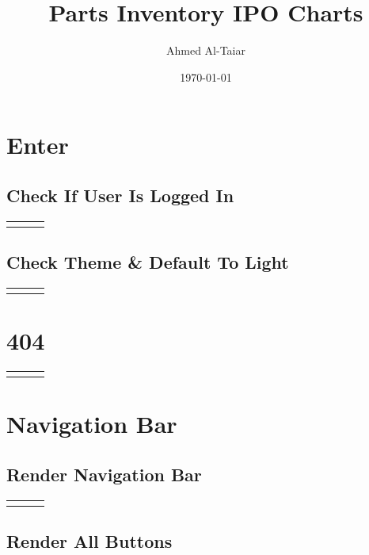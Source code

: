 \documentclass[12pt, letterpaper]{article}
\title{Parts Inventory IPO Charts}
\author{Ahmed Al-Taiar}
\date{\today}
\newcommand{\IPO}[3]{
  \begin{center}
    \begin{tabularx}{\linewidth}{XXX}
      \toprule
      \thead{Input} & \thead{Process} & \thead{Output} \\
      \midrule
      \RaggedRight{#1} & \RaggedRight{#2} & \RaggedRight{#3} \\
      \bottomrule
    \end{tabularx}
  \end{center}
}
\newcommand{\n}{\newline}
\begin{document}
\maketitle

\section{Enter}\label{enter}

\subsection{Check If User Is Logged In}\label{loggedin}

\IPO{}
{ Use the destructured \texttt{boolean isAuthenticated} variable within Redwood's \texttt{useAuth} React hook.}
{\textbf{IF} \texttt{isAuthenticated}, \texttt{true} \n \textbf{ELSE}, \texttt{false}}

\subsection{Check Theme \& Default To Light}

\IPO{}
{Check the stored \texttt{theme} value in the browser's local storage.\n~\n\textbf{IF} \texttt{theme} does not exist \n $\Rightarrow$ Set \texttt{theme} to ``light''}{\textbf{IF} \texttt{theme} is ``dark'', \texttt{true} \n \textbf{ELSE}, \texttt{false}}

\section{404}

\IPO{``Back to safety'' button}{}{Go to catalog page}

\section{Navigation Bar}

\subsection{Render Navigation Bar}\label{navbar}

\IPO{Child elements}{\textbf{IF} screen width is small\n$\Rightarrow$ Render menu with all buttons\n\textbf{ELSE}\n$\Rightarrow$ Render all buttons on navigation bar\n~\n Render child elements}{Page with navigation bar at the top}

\subsection{Render All Buttons}\label{buttons}
\end{document}
